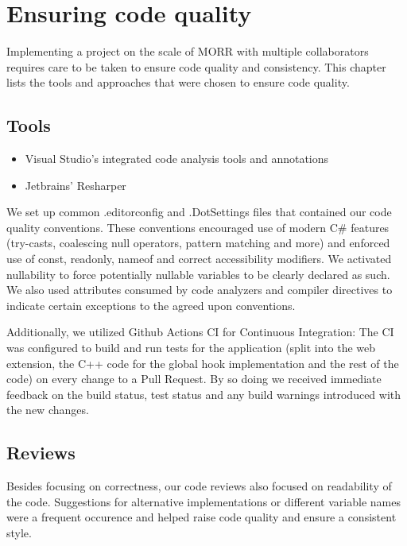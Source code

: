 \chapter{Ensuring code quality}

Implementing a project on the scale of MORR with multiple collaborators requires care to be taken to ensure code quality and consistency. This chapter lists the tools and approaches that were chosen to ensure code quality.

\section{Tools}

\begin{itemize}
    \item Visual Studio's integrated code analysis tools and annotations
    \item Jetbrains' Resharper
\end{itemize}

We set up common .editorconfig and .DotSettings files that contained our code quality conventions. These conventions encouraged use of modern C\# features (try-casts, coalescing null operators, pattern matching and more) and enforced use of const, readonly, nameof and correct accessibility modifiers. We activated nullability to force potentially nullable variables to be clearly declared as such. We also used attributes consumed by code analyzers and compiler directives to indicate certain exceptions to the agreed upon conventions.

Additionally, we utilized Github Actions CI for Continuous Integration: The CI was configured to build and run tests for the application (split into the web extension, the C++ code for the global hook implementation and the rest of the code) on every change to a Pull Request. By so doing we received immediate feedback on the build status, test status and any build warnings introduced with the new changes.

\section{Reviews}

Besides focusing on correctness, our code reviews also focused on readability of the code. Suggestions for alternative implementations or different variable names were a frequent occurence and helped raise code quality and ensure a consistent style.